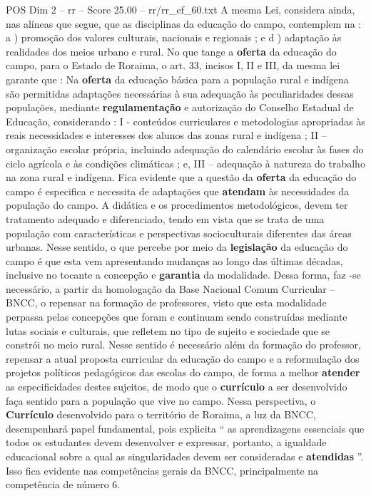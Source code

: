 \begin{textsample}{POS Dim 2 – rr – Score 25.00 – rr/rr\_ef\_60.txt}
A mesma Lei, considera ainda, nas alíneas que segue, que as disciplinas da educação do campo, contemplem na : a ) promoção dos valores culturais, nacionais e regionais ; e d ) adaptação às realidades dos meios urbano e rural.
No que tange a \textbf{oferta} da educação do campo, para o Estado de Roraima, o art. 33, incisos I, II e III, da mesma lei garante que : Na \textbf{oferta} da educação básica para a população rural e indígena são permitidas adaptações necessárias à sua adequação às peculiaridades dessas populações, mediante \textbf{regulamentação} e autorização do Conselho Estadual de Educação, considerando : I - conteúdos curriculares e metodologias apropriadas às reais necessidades e interesses dos alunos das zonas rural e indígena ; II – organização escolar própria, incluindo adequação do calendário escolar às fases do ciclo agrícola e às condições climáticas ; e, III – adequação à natureza do trabalho na zona rural e indígena.
Fica evidente que a questão da \textbf{oferta} da educação do campo é especifica e necessita de adaptações que \textbf{atendam} às necessidades da população do campo.
A didática e os procedimentos metodológicos, devem ter tratamento adequado e diferenciado, tendo em vista que se trata de uma população com características e perspectivas socioculturais diferentes das áreas urbanas.
Nesse sentido, o que percebe por meio da \textbf{legislação} da educação do campo é que esta vem apresentando mudanças ao longo das últimas décadas, inclusive no tocante a concepção e \textbf{garantia} da modalidade.
Dessa forma, faz -se necessário, a partir da homologação da Base Nacional Comum Curricular – BNCC, o repensar na formação de professores, visto que esta modalidade perpassa pelas concepções que foram e continuam sendo construídas mediante lutas sociais e culturais, que refletem no tipo de sujeito e sociedade que se constrói no meio rural.
Nesse sentido é necessário além da formação do professor, repensar a atual proposta curricular da educação do campo e a reformulação dos projetos políticos pedagógicos das escolas do campo, de forma a melhor \textbf{atender} as especificidades destes sujeitos, de modo que o \textbf{currículo} a ser desenvolvido faça sentido para a população que vive no campo.
Nessa perspectiva, o \textbf{Currículo} desenvolvido para o território de Roraima, a luz da BNCC, desempenhará papel fundamental, pois explicita “ as aprendizagens essenciais que todos os estudantes devem desenvolver e expressar, portanto, a igualdade educacional sobre a qual as singularidades devem ser consideradas e \textbf{atendidas} ”.
Isso fica evidente nas competências gerais da BNCC, principalmente na competência de número 6.

\end{textsample}
